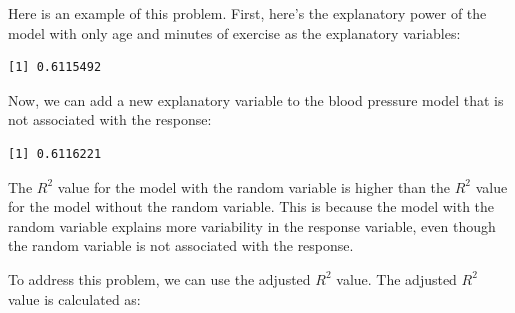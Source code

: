 \documentclass[
  letterpaper,
  8pt,
  a4paper]{book}
\newenvironment{Shaded}{\begin{snugshade}}{\end{snugshade}}
\newcommand{\AttributeTok}[1]{\textcolor[rgb]{0.40,0.45,0.13}{#1}}
\newcommand{\FunctionTok}[1]{\textcolor[rgb]{0.28,0.35,0.67}{#1}}
\newcommand{\NormalTok}[1]{\textcolor[rgb]{0.00,0.23,0.31}{#1}}
\newcommand{\OtherTok}[1]{\textcolor[rgb]{0.00,0.23,0.31}{#1}}
\newcommand{\SpecialCharTok}[1]{\textcolor[rgb]{0.37,0.37,0.37}{#1}}
\begin{document}
Here is an example of this problem. First, here's the explanatory power
of the model with only age and minutes of exercise as the explanatory
variables:

\begin{Shaded}
\end{Shaded}

\begin{verbatim}
[1] 0.6115492
\end{verbatim}

Now, we can add a new explanatory variable to the blood pressure model
that is not associated with the response:

\begin{Shaded}
\end{Shaded}

\begin{verbatim}
[1] 0.6116221
\end{verbatim}

The \(R^2\) value for the model with the random variable is higher than
the \(R^2\) value for the model without the random variable. This is
because the model with the random variable explains more variability in
the response variable, even though the random variable is not associated
with the response.

To address this problem, we can use the adjusted \(R^2\) value. The
adjusted \(R^2\) value is calculated as:
\end{document}
